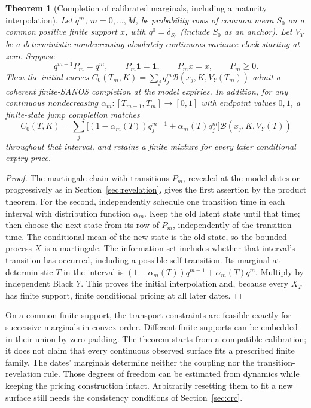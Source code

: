 \documentclass[11pt,a4paper]{article}
\numberwithin{equation}{section}
\newtheorem{theorem}{Theorem}[section]
\theoremstyle{definition}\newtheorem{definition}[theorem]{Definition}
\theoremstyle{remark}\newtheorem{remark}[theorem]{Remark}
\newcommand{\Black}{\mathcal B}\newcommand{\LC}{\mathcal L}
\begin{document}
\begin{theorem}[Completion of calibrated marginals, including a maturity interpolation]
\label{thm:gb-completion}
Let $q^m$, $m=0,\ldots,M$, be probability rows of common mean $S_0$ on a common positive finite support $x$, with $q^0=\delta_{S_0}$ (include $S_0$ as an anchor). Let $V_Y$ be a deterministic nondecreasing absolutely continuous variance clock starting at zero. Suppose
\begin{equation}
 q^{m-1}P_m=q^m,\qquad P_m\boldsymbol1=\boldsymbol1,
 \qquad P_mx=x,\qquad P_m\geq0.
 \label{eq:gb-transport}
\end{equation}
Then the initial curves $C_0(T_m,K)=\sum_jq_j^m\Black(x_j,K,V_Y(T_m))$ admit a coherent finite-SANOS completion at the model expiries. In addition, for any continuous nondecreasing $\alpha_m:[T_{m-1},T_m]\to[0,1]$ with endpoint values $0,1$, a finite-state jump completion matches
\begin{equation}
 C_0(T,K)=\sum_j\bigl[(1-\alpha_m(T))q_j^{m-1}
                         +\alpha_m(T)q_j^m\bigr]
                    \Black(x_j,K,V_Y(T))
 \label{eq:gb-maturity-interp}
\end{equation}
throughout that interval, and retains a finite mixture for every later conditional expiry price.
\end{theorem}
\begin{proof}
The martingale chain with transitions $P_m$, revealed at the model dates or progressively as in Section~\ref{sec:revelation}, gives the first assertion by the product theorem. For the second, independently schedule one transition time in each interval with distribution function $\alpha_m$. Keep the old latent state until that time; then choose the next state from its row of $P_m$, independently of the transition time. The conditional mean of the new state is the old state, so the bounded process $X$ is a martingale. The information set includes whether that interval's transition has occurred, including a possible self-transition. Its marginal at deterministic $T$ in the interval is $(1-\alpha_m(T))q^{m-1}+\alpha_m(T)q^m$. Multiply by independent Black $Y$. This proves the initial interpolation and, because every $X_T$ has finite support, finite conditional pricing at all later dates.
\end{proof}

On a common finite support, the transport constraints are feasible exactly for successive marginals in convex order. Different finite supports can be embedded in their union by zero-padding. The theorem starts from a compatible calibration; it does not claim that every continuous observed surface fits a prescribed finite family. The dates' marginals determine neither the coupling nor the transition-revelation rule. Those degrees of freedom can be estimated from dynamics while keeping the pricing construction intact. Arbitrarily resetting them to fit a new surface still needs the consistency conditions of Section~\ref{sec:crc}.
\end{document}
